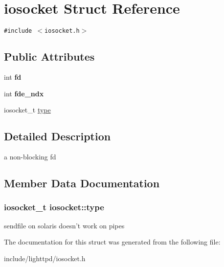 \hypertarget{structiosocket}{
\section{iosocket Struct Reference}
\label{structiosocket}
}
{\tt \#include $<$iosocket.h$>$}

\subsection*{Public Attributes}
\begin{CompactItemize}
\item 
\hypertarget{structiosocket_c5dcd0d6bc41ffffa72a087555d012fc}{
int \textbf{fd}}
\label{structiosocket_c5dcd0d6bc41ffffa72a087555d012fc}

\item 
\hypertarget{structiosocket_ef7db9c046476d8fcbd24066daaa23bf}{
int \textbf{fde\_\-ndx}}
\label{structiosocket_ef7db9c046476d8fcbd24066daaa23bf}

\item 
iosocket\_\-t \hyperlink{structiosocket_4a478938dc364d5e9658b270039c5794}{type}
\end{CompactItemize}


\subsection{Detailed Description}
a non-blocking fd 

\subsection{Member Data Documentation}
\hypertarget{structiosocket_4a478938dc364d5e9658b270039c5794}{
\subsubsection[{type}]{\setlength{\rightskip}{0pt plus 5cm}iosocket\_\-t {\bf iosocket::type}}}
\label{structiosocket_4a478938dc364d5e9658b270039c5794}


sendfile on solaris doesn't work on pipes 

The documentation for this struct was generated from the following file:\begin{CompactItemize}
\item 
include/lighttpd/iosocket.h\end{CompactItemize}

